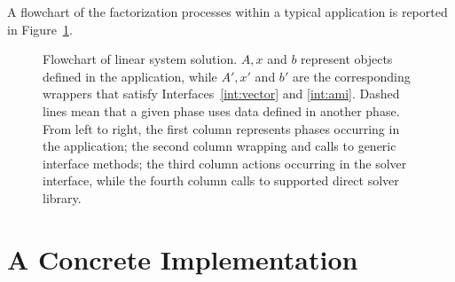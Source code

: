 \documentclass[acmtocl]{acmtrans2m}
\begin{document}
A flowchart of the factorization processes within a typical application
is reported in Figure~\ref{fig:flowchart}.
\begin{figure}
\begin{center}
\end{center}
\caption{Flowchart of linear system solution. $A, x$ and $b$ represent objects
  defined in the application, while $A', x'$ and $b'$ are the corresponding 
    wrappers that
    satisfy Interfaces~\ref{int:vector} and \ref{int:ami}. Dashed lines mean
    that a given phase uses data defined in another phase. From left to right,
  the first column 
    represents phases occurring in the application; the second column wrapping
and calls to generic interface methods; the third column actions
occurring in the solver interface, while the fourth column calls to supported
direct solver library.}
\label{fig:flowchart}
\end{figure}

\section{A Concrete Implementation}
\label{sec:concrete}
\end{document}
